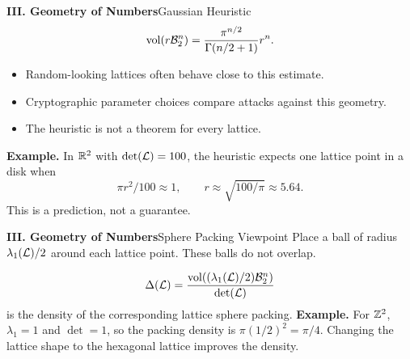 \begin{frame}[shrink=8]{\textbf{III. Geometry of Numbers}}{Gaussian Heuristic}
\[
  \operatorname{vol}(r\mathcal{B}_2^n)=
  \frac{\pi^{n/2}}{\Gamma(n/2+1)}r^n.
\]
\begin{itemize}
  \item Random-looking lattices often behave close to this estimate.
  \item Cryptographic parameter choices compare attacks against this geometry.
  \item The heuristic is not a theorem for every lattice.
\end{itemize}
\textbf{Example.}\; In $\mathbb{R}^2$ with $\det(\mathcal{L})=100$, the heuristic expects one lattice point in a disk when
\[
  \pi r^2/100\approx1,\qquad r\approx\sqrt{100/\pi}\approx5.64.
\]
This is a prediction, not a guarantee.
\end{frame}

\begin{frame}[shrink=5]{\textbf{III. Geometry of Numbers}}{Sphere Packing Viewpoint}
Place a ball of radius $\lambda_1(\mathcal{L})/2$ around each lattice point. These balls do not overlap.
\begin{center}
\end{center}
\[
  \Delta(\mathcal{L})=\frac{\operatorname{vol}((\lambda_1(\mathcal{L})/2)\mathcal{B}_2^n)}{\det(\mathcal{L})}
\]
is the density of the corresponding lattice sphere packing.
\textbf{Example.}\; For $\mathbb{Z}^2$, $\lambda_1=1$ and $\det=1$, so the packing density is
$\pi(1/2)^2=\pi/4$.
Changing the lattice shape to the hexagonal lattice improves the density.
\end{frame}

